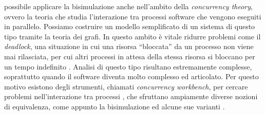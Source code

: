 \accente possibile applicare la bisimulazione anche nell'ambito della \emph{concurrency theory}, ovvero la teoria che studia l'interazione tra processi software che vengono eseguiti in parallelo. Possiamo costruire un modello semplificato di un sistema di questo tipo tramite la teoria dei grafi. In questo ambito è vitale ridurre problemi come il \emph{deadlock}, una situazione in cui una risorsa ``bloccata'' da un processo non viene mai rilasciata, per cui altri processi in attesa della stessa risorsa si bloccano per un tempo indefinito \cite{concurrency}. Analisi di questo tipo risultano estremamente complesse, soprattutto quando il software diventa molto complesso ed articolato. Per questo motivo esistono degli strumenti, chiamati \emph{concurrency workbench}, per cercare problemi nell'interazione tra processi \cite{caal}, che sfruttano ampiamente diverse nozioni di equivalenza, come appunto la bisimulazione ed alcune sue varianti \cite{kanellakis}.
